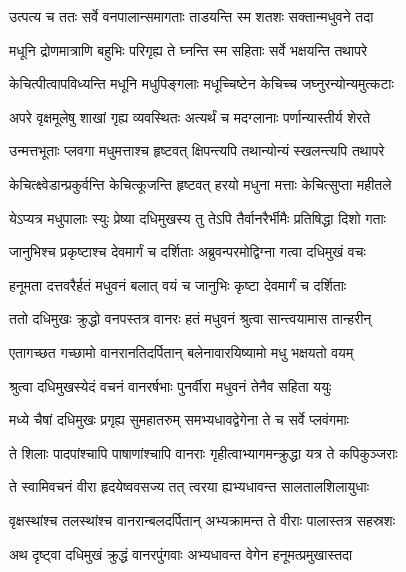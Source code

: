 \twolineshloka
{उत्पत्य च ततः सर्वे वनपालान्समागताः}
{ताडयन्ति स्म शतशः सक्तान्मधुवने तदा} %

\twolineshloka
{मधूनि द्रोणमात्राणि बहुभिः परिगृह्य ते}
{घ्नन्ति स्म सहिताः सर्वे भक्षयन्ति तथापरे} %

\twolineshloka
{केचित्पीत्वापविध्यन्ति मधूनि मधुपिङ्गलाः}
{मधूच्चिष्टेन केचिच्च जघ्नुरन्योन्यमुत्कटाः} %

\twolineshloka
{अपरे वृक्षमूलेषु शाखां गृह्य व्यवस्थितः}
{अत्यर्थं च मदग्लानाः पर्णान्यास्तीर्य शेरते} %

\twolineshloka
{उन्मत्तभूताः प्लवगा मधुमत्ताश्च हृष्टवत्}
{क्षिपन्त्यपि तथान्योन्यं स्खलन्त्यपि तथापरे} %

\twolineshloka
{केचित्क्ष्वेडान्प्रकुर्वन्ति केचित्कूजन्ति हृष्टवत्}
{हरयो मधुना मत्ताः केचित्सुप्ता महीतले} %

\twolineshloka
{येऽप्यत्र मधुपालाः स्युः प्रेष्या दधिमुखस्य तु}
{तेऽपि तैर्वानरैर्भीमैः प्रतिषिद्धा दिशो गताः} %

\twolineshloka
{जानुभिश्च प्रकृष्टाश्च देवमार्गं च दर्शिताः}
{अब्रुवन्परमोद्विग्ना गत्वा दधिमुखं वचः} %

\twolineshloka
{हनूमता दत्तवरैर्हतं मधुवनं बलात्}
{वयं च जानुभिः कृष्टा देवमार्गं च दर्शिताः} %

\twolineshloka
{ततो दधिमुखः क्रुद्धो वनपस्तत्र वानरः}
{हतं मधुवनं श्रुत्वा सान्त्वयामास तान्हरीन्} %

\twolineshloka
{एतागच्छत गच्छामो वानरानतिदर्पितान्}
{बलेनावारयिष्यामो मधु भक्षयतो वयम्} %

\twolineshloka
{श्रुत्वा दधिमुखस्येदं वचनं वानरर्षभाः}
{पुनर्वीरा मधुवनं तेनैव सहिता ययुः} %

\twolineshloka
{मध्ये चैषां दधिमुखः प्रगृह्य सुमहातरुम्}
{समभ्यधावद्वेगेना ते च सर्वे प्लवंगमाः} %

\twolineshloka
{ते शिलाः पादपांश्चापि पाषाणांश्चापि वानराः}
{गृहीत्वाभ्यागमन्क्रुद्धा यत्र ते कपिकुञ्जराः} %

\twolineshloka
{ते स्वामिवचनं वीरा हृदयेष्ववसज्य तत्}
{त्वरया ह्यभ्यधावन्त सालतालशिलायुधाः} %

\twolineshloka
{वृक्षस्थांश्च तलस्थांश्च वानरान्बलदर्पितान्}
{अभ्यक्रामन्त ते वीराः पालास्तत्र सहस्रशः} %

\twolineshloka
{अथ दृष्ट्वा दधिमुखं क्रुद्धं वानरपुंगवाः}
{अभ्यधावन्त वेगेन हनूमत्प्रमुखास्तदा} %

